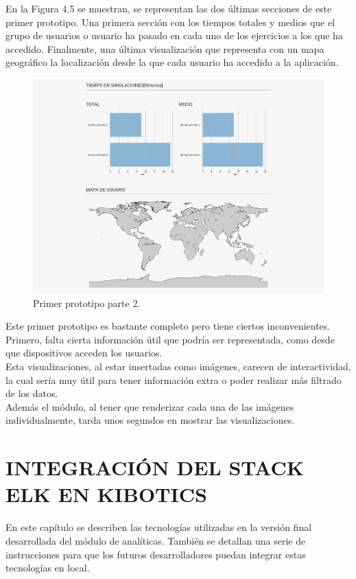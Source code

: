 \documentclass[11pt,a4paper]{book}
\begin{document}
			En la Figura 4.5 se muestran, se representan las dos últimas secciones de este primer prototipo. Una primera sección con los tiempos totales y medios que el grupo de usuarios o usuario ha pasado en cada uno de los ejercicios a los que ha accedido. Finalmente, una última visualización que representa con un mapa geográfico la localización desde la que cada usuario ha accedido a la aplicación.\\
			
			\begin{figure}[H]
				\centering
				\includegraphics[width=14cm, keepaspectratio]{img/primer_prototipo_2.png}
				\caption{Primer prototipo parte 2.}
				\label{fig:primer_prototipo_2}
			\end{figure}
		
			Este primer prototipo es bastante completo pero tiene ciertos inconvenientes. Primero, falta cierta información útil que podría ser representada, como desde que dispositivos acceden los usuarios.\\
	
			Esta visualizaciones, al estar insertadas como imágenes, carecen de interactividad, la cual sería muy útil para tener información extra o poder realizar más filtrado de los datos.\\
			
			Además el módulo, al tener que renderizar cada una de las imágenes individualmente, tarda unos segundos en mostrar las visualizaciones.
		
	
	
	\chapter{INTEGRACIÓN DEL STACK ELK EN KIBOTICS}
		En este capítulo se describen las tecnologías utilizadas en la versión final desarrollada del módulo de analíticas. También se detallan una serie de instrucciones para que los futuros desarrolladores puedan integrar estas tecnologías en local.
		
\end{document}

